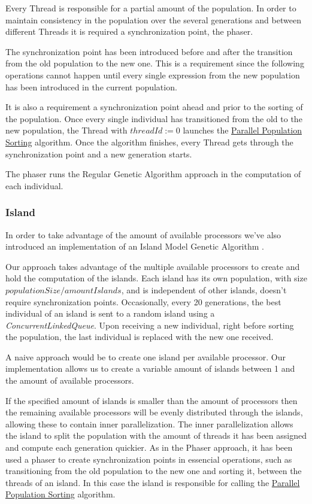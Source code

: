 \documentclass[runningheads]{llncs}
\begin{document}
Every Thread is responsible for a partial amount of the population. In order to maintain consistency in the population over the several generations and between different Threads it is required a synchronization point, the phaser. 

The synchronization point has been introduced before and after the transition from the old population to the new one. This is a requirement since the following operations cannot happen until  every single expression from the new population has been introduced in the current population.

It is also a requirement a synchronization point ahead and prior to the sorting  of the population. Once every single individual has transitioned from the old to the new population, the Thread with \(threadId := 0\) launches the \hyperref[subsubsec:parallelSort]{Parallel Population Sorting} algorithm. Once the algorithm finishes, every Thread gets through the synchronization point and a new generation starts.

The phaser runs the Regular Genetic Algorithm approach in the computation of each individual.

\subsubsection{Island} \hfill \par
In order to take advantage of the amount of available processors we've also introduced an implementation of an Island Model Genetic Algorithm \cite{islandModelGA}.

Our approach takes advantage of the multiple available processors to create and hold the computation of the islands. Each island has its own population, with size  \(populationSize / amountIslands \), and is independent of other islands, doesn't require synchronization points. Occasionally, every 20 generations, the best individual of an island is sent to a random island using a \emph{ConcurrentLinkedQueue}. Upon receiving a new individual, right before sorting the population, the last individual is replaced with the new one received.

A naive approach would be to create one island per available processor. Our implementation allows us to create a variable amount of islands between 1 and the amount of available processors.

 If the specified amount of islands is smaller than the amount of processors then the remaining available processors will be evenly distributed through the islands, allowing these to contain inner parallelization. The inner parallelization allows the island to split the population with the amount of threads it has been assigned and compute each generation quickier. As in the Phaser approach, it has been used a phaser to create synchronization points in essencial operations, such as transitioning from the old population to the new one and sorting it, between the threads of an island. In this case the island is responsible for calling the \hyperref[subsubsec:parallelSort]{Parallel Population Sorting} algorithm.
\end{document}
